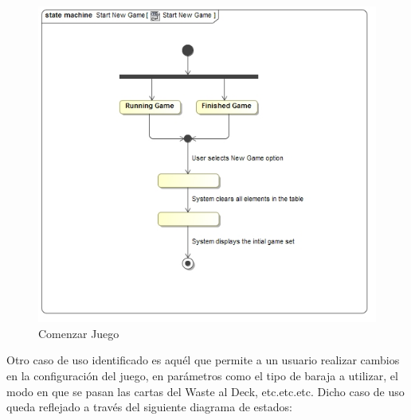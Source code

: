 \documentclass[11pt]{article}
\begin{document}
\begin{center}
 \begin{figure}[H]
 \begin{center}
   \includegraphics[width=15cm]{DomainModel/StartNewGame00.jpg}
   \caption{Comenzar Juego}
   \label{fig:startnewgame}
 \end{center}
 \end{figure}
\end{center}

Otro caso de uso identificado es aquél que permite a un usuario realizar cambios en la configuración del juego, en parámetros como el tipo de baraja a utilizar, el modo en que se pasan las cartas del Waste al Deck, etc.etc.etc. Dicho caso de uso queda reflejado a través del siguiente diagrama de estados:
\end{document}

